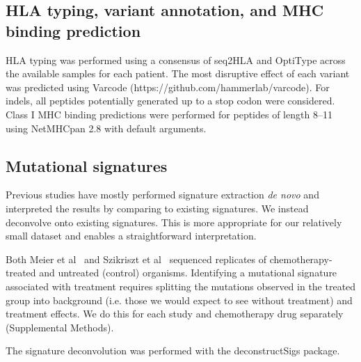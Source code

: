 
\subsection*{HLA typing, variant annotation, and MHC binding prediction}
HLA typing was performed using a consensus of seq2HLA\cite{Boegel_2012} and OptiType\cite{Szolek_2014} across the available samples for each patient. The most disruptive effect of each variant was predicted using Varcode (https://github.com/hammerlab/varcode). For indels, all peptides potentially generated up to a stop codon were considered. Class I MHC binding predictions were performed for peptides of length 8--11 using NetMHCpan 2.8\cite{Lundegaard_2008} with default arguments.

\subsection*{Mutational signatures}
Previous studies have mostly performed signature extraction \textit{de novo} and interpreted the results by comparing to existing signatures. We instead deconvolve onto existing signatures. This is more appropriate for our relatively small dataset and enables a straightforward interpretation.

Both Meier et al~\cite{Meier_2014} and Szikriszt et al~\cite{Szikriszt_2016} sequenced replicates of chemotherapy-treated and untreated (control) organisms. Identifying a mutational signature associated with treatment requires splitting the mutations observed in the treated group into background (i.e. those we would expect to see without treatment) and treatment effects. We do this for each study and chemotherapy drug separately (Supplemental Methods).

The signature deconvolution was performed with the deconstructSigs\cite{Rosenthal_2016} package.

